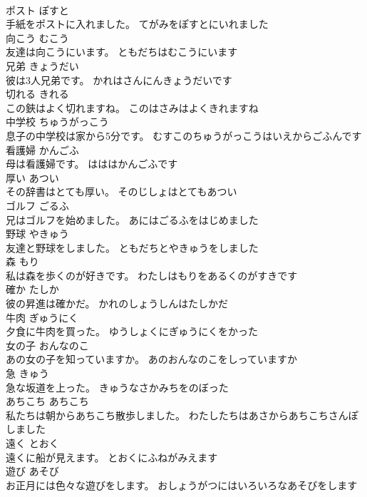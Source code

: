\documentclass[8pt]{extreport}
\begin{document}
\begin{CJK}{UTF8}{min}
\\	ポスト	ぽすと	
\\	手紙をポストに入れました。	てがみをぽすとにいれました	
\\	向こう	むこう	
\\	友達は向こうにいます。	ともだちはむこうにいます	
\\	兄弟	きょうだい	
\\	彼は3人兄弟です。	かれはさんにんきょうだいです	
\\	切れる	きれる	
\\	この鋏はよく切れますね。	このはさみはよくきれますね	
\\	中学校	ちゅうがっこう	
\\	息子の中学校は家から5分です。	むすこのちゅうがっこうはいえからごふんです	
\\	看護婦	かんごふ	
\\	母は看護婦です。	はははかんごふです	
\\	厚い	あつい	
\\	その辞書はとても厚い。	そのじしょはとてもあつい	
\\	ゴルフ	ごるふ	
\\	兄はゴルフを始めました。	あにはごるふをはじめました	
\\	野球	やきゅう	
\\	友達と野球をしました。	ともだちとやきゅうをしました	
\\	森	もり	
\\	私は森を歩くのが好きです。	わたしはもりをあるくのがすきです	
\\	確か	たしか	
\\	彼の昇進は確かだ。	かれのしょうしんはたしかだ	
\\	牛肉	ぎゅうにく	
\\	夕食に牛肉を買った。	ゆうしょくにぎゅうにくをかった	
\\	女の子	おんなのこ	
\\	あの女の子を知っていますか。	あのおんなのこをしっていますか	
\\	急	きゅう	
\\	急な坂道を上った。	きゅうなさかみちをのぼった	
\\	あちこち	あちこち	
\\	私たちは朝からあちこち散歩しました。	わたしたちはあさからあちこちさんぽしました	
\\	遠く	とおく	
\\	遠くに船が見えます。	とおくにふねがみえます	
\\	遊び	あそび	
\\	お正月には色々な遊びをします。	おしょうがつにはいろいろなあそびをします	

\end{CJK}
\end{document}

